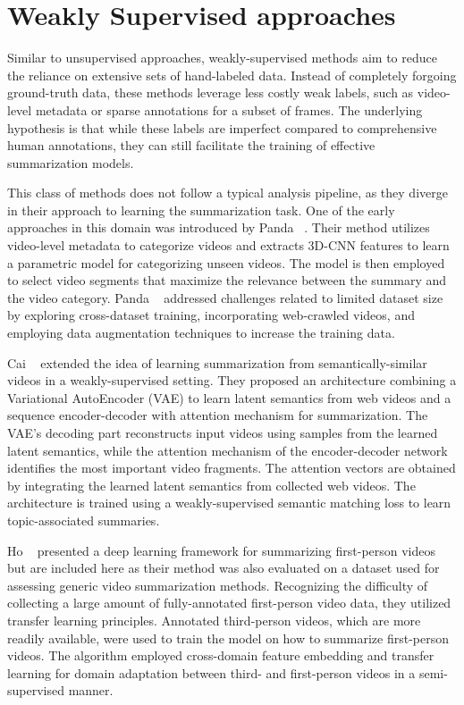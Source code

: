 \section{Weakly Supervised approaches}
\label{section:rel-weakly}

Similar to unsupervised approaches, weakly-supervised methods aim to reduce the reliance on extensive sets of hand-labeled data. Instead of completely forgoing ground-truth data, these methods leverage less costly weak labels, such as video-level metadata or sparse annotations for a subset of frames. The underlying hypothesis is that while these labels are imperfect compared to comprehensive human annotations, they can still facilitate the training of effective summarization models.

This class of methods does not follow a typical analysis pipeline, as they diverge in their approach to learning the summarization task. One of the early approaches in this domain was introduced by Panda \etal~\cite{panda2017weakly}. Their method utilizes video-level metadata to categorize videos and extracts 3D-CNN features to learn a parametric model for categorizing unseen videos. The model is then employed to select video segments that maximize the relevance between the summary and the video category. Panda \etal~ addressed challenges related to limited dataset size by exploring cross-dataset training, incorporating web-crawled videos, and employing data augmentation techniques to increase the training data.

Cai \etal~\cite{cai2018weakly} extended the idea of learning summarization from semantically-similar videos in a weakly-supervised setting. They proposed an architecture combining a Variational AutoEncoder (VAE) to learn latent semantics from web videos and a sequence encoder-decoder with attention mechanism for summarization. The VAE's decoding part reconstructs input videos using samples from the learned latent semantics, while the attention mechanism of the encoder-decoder network identifies the most important video fragments. The attention vectors are obtained by integrating the learned latent semantics from collected web videos. The architecture is trained using a weakly-supervised semantic matching loss to learn topic-associated summaries.

Ho \etal~\cite{Ho2018FVPSum} presented a deep learning framework for summarizing first-person videos but are included here as their method was also evaluated on a dataset used for assessing generic video summarization methods. Recognizing the difficulty of collecting a large amount of fully-annotated first-person video data, they utilized transfer learning principles. Annotated third-person videos, which are more readily available, were used to train the model on how to summarize first-person videos. The algorithm employed cross-domain feature embedding and transfer learning for domain adaptation between third- and first-person videos in a semi-supervised manner.


